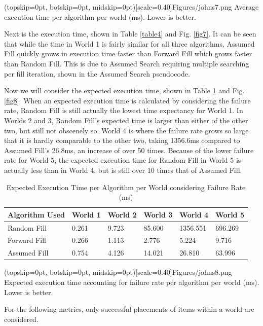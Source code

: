 \documentclass{ieeeaccess}
\begin{document}
\Figure[t!](topskip=0pt, botskip=0pt, midskip=0pt)[scale=0.40]{Figures/johns7.png}
{Average execution time per algorithm per world (ms). Lower is better.\label{fig7}}

Next is the execution time, shown in Table \ref{table4} and Fig. \ref{fig7}. It can be seen
that while the time in World 1 is fairly similar for all three algorithms, Assumed Fill quickly
grows in execution time faster than Forward Fill which grows faster than Random Fill. This is
due to Assumed Search requiring multiple searching per fill iteration, shown in the Assumed
Search pseudocode.

Now we will consider the expected execution time, shown in Table \ref{table5} and Fig.
\ref{fig8}. When an expected execution time is calculated by considering the failure rate,
Random Fill is still actually the lowest time expectancy for World 1. In Worlds 2 and 3, Random
Fill’s expected time is larger than either of the other two, but still not obscenely so. World
4 is where the failure rate grows so large that it is hardly comparable to the other two,
taking 1356.6ms compared to Assumed Fill’s 26.8ms, an increase of over 50 times. Because of the
lower failure rate for World 5, the expected execution time for Random Fill in World 5 is
actually less than in World 4, but is still over 10 times that of Assumed Fill.

\begin{table}
\caption{Expected Execution Time per Algorithm per World considering Failure Rate (ms)}
\label{table5}
\setlength{\tabcolsep}{3pt}
\renewcommand{\arraystretch}{1.2}
\begin{tabular}{ |p{60pt}|p{30pt}|p{30pt}|p{30pt}|p{30pt}|p{30pt}|  }
 \hline
 Algorithm Used & World 1 & World 2 & World 3 & World 4 & World 5\\
 \hline
 Random Fill & 0.261 & 9.723 & 85.600 & 1356.551 & 696.269 \\
 \hline
 Forward Fill & 0.266 & 1.113 & 2.776 & 5.224 & 9.716 \\
 \hline
 Assumed Fill & 0.754 & 4.126 & 14.021 & 26.810 & 63.996 \\
 \hline
\end{tabular}
\end{table}

\Figure[t!](topskip=0pt, botskip=0pt, midskip=0pt)[scale=0.40]{Figures/johns8.png}
{Expected execution time accounting for failure rate per algorithm per world (ms). Lower is
better.\label{fig8}}

For the following metrics, only successful placements of items within a world are considered.
\end{document}
